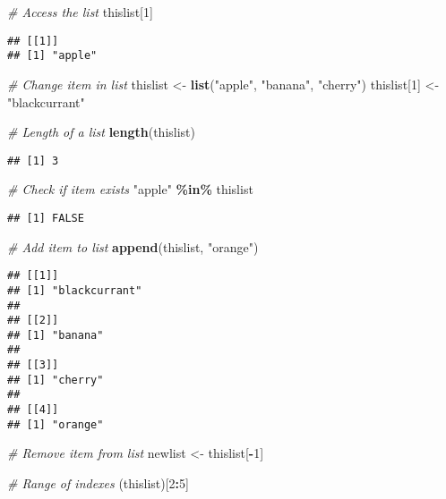 \documentclass[
]{article}
\newenvironment{Shaded}{\begin{snugshade}}{\end{snugshade}}
\newcommand{\CommentTok}[1]{\textcolor[rgb]{0.56,0.35,0.01}{\textit{#1}}}
\newcommand{\DecValTok}[1]{\textcolor[rgb]{0.00,0.00,0.81}{#1}}
\newcommand{\FunctionTok}[1]{\textcolor[rgb]{0.13,0.29,0.53}{\textbf{#1}}}
\newcommand{\NormalTok}[1]{#1}
\newcommand{\OtherTok}[1]{\textcolor[rgb]{0.56,0.35,0.01}{#1}}
\newcommand{\SpecialCharTok}[1]{\textcolor[rgb]{0.81,0.36,0.00}{\textbf{#1}}}
\newcommand{\StringTok}[1]{\textcolor[rgb]{0.31,0.60,0.02}{#1}}
\begin{document}
\begin{Shaded}
\begin{Highlighting}[]
\CommentTok{\# Access the list}
\NormalTok{thislist[}\DecValTok{1}\NormalTok{]}
\end{Highlighting}
\end{Shaded}

\begin{verbatim}
## [[1]]
## [1] "apple"
\end{verbatim}

\begin{Shaded}
\begin{Highlighting}[]
\CommentTok{\# Change item in list}
\NormalTok{thislist }\OtherTok{\textless{}{-}} \FunctionTok{list}\NormalTok{(}\StringTok{"apple"}\NormalTok{, }\StringTok{"banana"}\NormalTok{, }\StringTok{"cherry"}\NormalTok{)}
\NormalTok{thislist[}\DecValTok{1}\NormalTok{] }\OtherTok{\textless{}{-}} \StringTok{"blackcurrant"}

\CommentTok{\# Length of a list}
\FunctionTok{length}\NormalTok{(thislist)}
\end{Highlighting}
\end{Shaded}

\begin{verbatim}
## [1] 3
\end{verbatim}

\begin{Shaded}
\begin{Highlighting}[]
\CommentTok{\# Check if item exists}
\StringTok{"apple"} \SpecialCharTok{\%in\%}\NormalTok{ thislist}
\end{Highlighting}
\end{Shaded}

\begin{verbatim}
## [1] FALSE
\end{verbatim}

\begin{Shaded}
\begin{Highlighting}[]
\CommentTok{\# Add item to list}
\FunctionTok{append}\NormalTok{(thislist, }\StringTok{"orange"}\NormalTok{)}
\end{Highlighting}
\end{Shaded}

\begin{verbatim}
## [[1]]
## [1] "blackcurrant"
## 
## [[2]]
## [1] "banana"
## 
## [[3]]
## [1] "cherry"
## 
## [[4]]
## [1] "orange"
\end{verbatim}

\begin{Shaded}
\begin{Highlighting}[]
\CommentTok{\# Remove item from list}
\NormalTok{newlist }\OtherTok{\textless{}{-}}\NormalTok{ thislist[}\SpecialCharTok{{-}}\DecValTok{1}\NormalTok{]}

\CommentTok{\# Range of indexes}
\NormalTok{(thislist)[}\DecValTok{2}\SpecialCharTok{:}\DecValTok{5}\NormalTok{]}
\end{Highlighting}
\end{Shaded}
\end{document}
